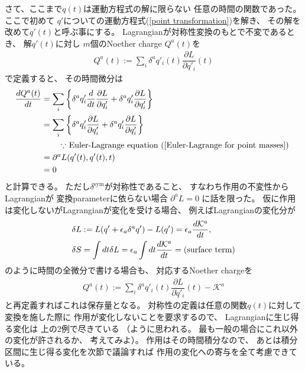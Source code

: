 さて、ここまで$q(t)$は運動方程式の解に限らない
任意の時間の関数であった。
ここで初めて
$q'$についての運動方程式(\ref{point transformation})を解き、
その解を改めて$q'(t)$と呼ぶ事にする。
Lagrangianが対称性変換のもとで不変であるとき、
解$q'(t)$に対し
$m$個のNoether charge $Q^a(t)$を
\begin{align}
  Q^a(t):=
  \sum_i
    \delta^a q'_i (t)
  \dfrac{\partial L}{\partial \dot{q}'_i} (t)
\end{align}
で定義すると、
その時間微分は
\begin{align}
  \dfrac{d Q^a(t)}{dt}
&=
  \sum_i
  \bigg\{
    \delta^a q'_i
  \dfrac{d}{dt}\dfrac{\partial L}{\partial \dot{q}'_i }
+
    \delta^a \dot{q}'_i
    \dfrac{\partial L}{\partial \dot{q}'_i}
  \bigg\}
\notag\\&=
  \sum_i
  \bigg\{
      \delta^a q'_i
    \dfrac{\partial L}{\partial q'_i}
  +
      \delta^a \dot{q}'_i
    \dfrac{\partial L}{\partial \dot{q}'_i}
  \bigg\}
\notag\\&\qquad
    \text{
      $\because$ Euler-Lagrange equation
      (\ref{Euler-Lagrange for point masses})
    }
\notag\\&=
  \partial^a L(q'(t),\dot{q}'(t),t)
  \notag\\&= 0
\end{align}
と計算できる。
ただし$\delta^{\mathrm{sym}}$が対称性であること、
すなわち作用の不変性からLagrangianが
変換parameterに依らない場合
$\partial^a L = 0$
に話を限った。
仮に作用は変化しないがLagrangianが変化を受ける場合、
例えばLagrangianの変化分が
\begin{align}
  \delta L &:= L( q' + \epsilon_a \delta^a q' ) - L( q' )
  = \epsilon_a \dfrac{d \mathcal{K}^a}{dt}
  ,\notag\\
  \delta S &= \int dt \delta L
  = \epsilon_a \int dt \dfrac{d \mathcal{K}^a}{dt}
  = \text{(surface term)}
\end{align}
のように時間の全微分で書ける場合も、
対応するNoether chargeを
\begin{align}
  Q^a(t):=
  \sum_i
    \delta^a q'_i (t)
  \dfrac{\partial L}{\partial \dot{q}'_i} (t)
  -
  \mathcal{K}^a
\end{align}
と再定義すればこれは保存量となる。
対称性の定義は任意の関数$q(t)$に対して
変換を施した際に
作用が変化しないことを要求するので、
Lagrangianに生じ得る変化は
上の$2$例で尽きている
（ように思われる。
最も一般の場合にこれ以外の変化が許されるか、
考えてみよ）。
作用はその時間積分なので、
あとは積分区間に生じ得る変化を次節で議論すれば
作用の変化への寄与を全て考慮できている。

